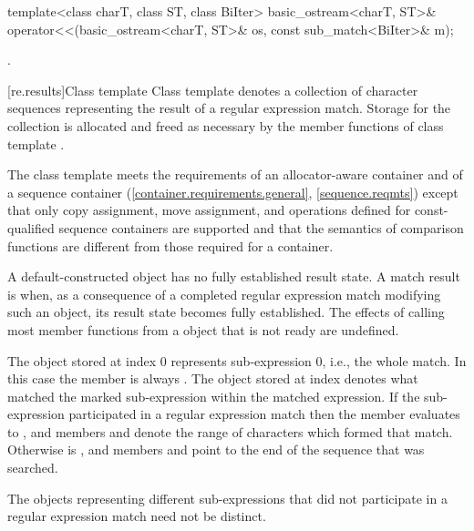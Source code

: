 %
%
\begin{itemdecl}
template<class charT, class ST, class BiIter>
  basic_ostream<charT, ST>&
    operator<<(basic_ostream<charT, ST>& os, const sub_match<BiIter>& m);
\end{itemdecl}

\begin{itemdescr}
\pnum
\returns
{}.
\end{itemdescr}

[re.results]{Class template }
\pnum
{}%
Class template  denotes a collection of character
sequences representing the result of a regular expression
match. Storage for the collection is allocated and freed as necessary
by the member functions of class template .

\pnum
{}%
%
%
The class template  meets the requirements of an
allocator-aware container and of a sequence container
(\ref{container.requirements.general}, \ref{sequence.reqmts})
except that only
copy assignment,
move assignment, and
operations defined for const-qualified sequence containers
are supported and
that the semantics of comparison functions are different from those
required for a container.

\pnum
A default-constructed  object has no fully established result state. A
match result is  when, as a consequence of a completed regular expression match
modifying such an object, its result state becomes fully established. The effects of calling
most member functions from a  object that is not ready are undefined.

\pnum
{}%
The  object stored at index 0 represents sub-expression 0,
i.e., the whole match. In this case the  member
 is always . The 
object stored at index  denotes what matched the marked
sub-expression  within the matched expression. If the
sub-expression  participated in a regular expression
match then the  member  evaluates to , and
members  and  denote the range of characters
 which formed that
match. Otherwise  is , and members 
and  point to the end of the sequence
that was searched.
\begin{note}
The  objects representing
different sub-expressions that did not participate in a regular expression
match need not be distinct.
\end{note}

